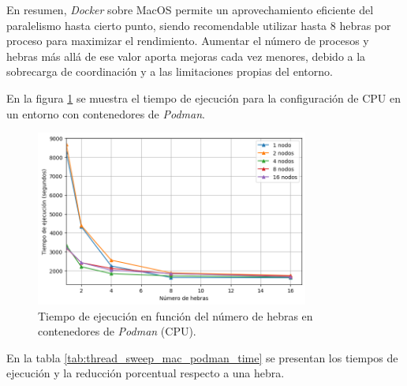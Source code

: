 En resumen, \textit{Docker} sobre MacOS permite un aprovechamiento eficiente del paralelismo hasta cierto punto, siendo recomendable utilizar hasta 8 hebras por proceso para maximizar el rendimiento. Aumentar el número de procesos y hebras más allá de ese valor aporta mejoras cada vez menores, debido a la sobrecarga de coordinación y a las limitaciones propias del entorno.

En la figura \ref{fig:thread_sweep_mac_podman_time} se muestra el tiempo de ejecución para la configuración de CPU en un entorno con contenedores de \textit{Podman}.

\begin{figure}[ht]
    \centering
    \includegraphics[width=0.8\textwidth]{imagenes/cap5/thread_sweep_mac_podman_time.png}
    \caption{Tiempo de ejecución en función del número de hebras en contenedores de \textit{Podman} (CPU).}
    \label{fig:thread_sweep_mac_podman_time}
\end{figure}

En la tabla \ref{tab:thread_sweep_mac_podman_time} se presentan los tiempos de ejecución y la reducción porcentual respecto a una hebra.

